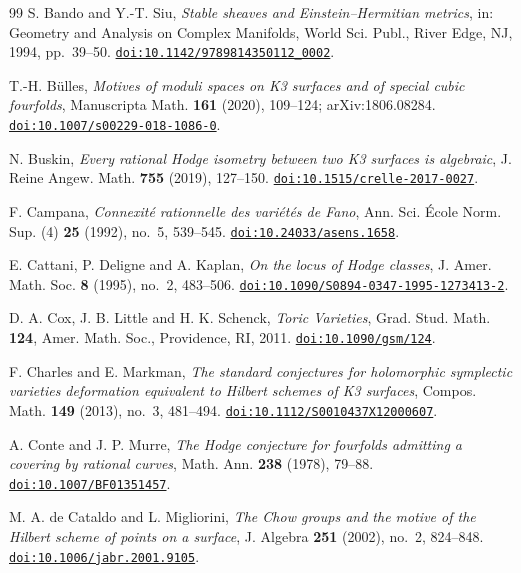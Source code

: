 \documentclass[11pt,reqno]{amsart}
\theoremstyle{plain}
\theoremstyle{definition}
\theoremstyle{remark}
\begin{document}
\begin{thebibliography}{99}
S. Bando and Y.-T. Siu,
\emph{Stable sheaves and Einstein--Hermitian metrics},
in: Geometry and Analysis on Complex Manifolds,
World Sci. Publ., River Edge, NJ, 1994, pp.~39--50.
\href{https://doi.org/10.1142/9789814350112_0002}{\texttt{doi:10.1142/9789814350112\_0002}}.

T.-H. B\"ulles,
\emph{Motives of moduli spaces on K3 surfaces and of special cubic
fourfolds},
Manuscripta Math. \textbf{161} (2020), 109--124; arXiv:1806.08284.
\href{https://doi.org/10.1007/s00229-018-1086-0}{\texttt{doi:10.1007/s00229-018-1086-0}}.

N. Buskin,
\emph{Every rational Hodge isometry between two K3 surfaces is algebraic},
J. Reine Angew. Math. \textbf{755} (2019), 127--150.
\href{https://doi.org/10.1515/crelle-2017-0027}{\texttt{doi:10.1515/crelle-2017-0027}}.

F. Campana,
\emph{Connexit\'e rationnelle des vari\'et\'es de Fano},
Ann. Sci. \'Ecole Norm. Sup. (4) \textbf{25} (1992), no.~5, 539--545.
\href{https://doi.org/10.24033/asens.1658}{\texttt{doi:10.24033/asens.1658}}.

E. Cattani, P. Deligne and A. Kaplan,
\emph{On the locus of Hodge classes},
J. Amer. Math. Soc. \textbf{8} (1995), no.~2, 483--506.
\href{https://doi.org/10.1090/S0894-0347-1995-1273413-2}{\texttt{doi:10.1090/S0894-0347-1995-1273413-2}}.

D. A. Cox, J. B. Little and H. K. Schenck,
\emph{Toric Varieties},
Grad. Stud. Math. \textbf{124}, Amer. Math. Soc., Providence, RI, 2011.
\href{https://doi.org/10.1090/gsm/124}{\texttt{doi:10.1090/gsm/124}}.

F. Charles and E. Markman,
\emph{The standard conjectures for holomorphic symplectic varieties
deformation equivalent to Hilbert schemes of K3 surfaces},
Compos. Math. \textbf{149} (2013), no.~3, 481--494.
\href{https://doi.org/10.1112/S0010437X12000607}{\texttt{doi:10.1112/S0010437X12000607}}.

A. Conte and J. P. Murre,
\emph{The Hodge conjecture for fourfolds admitting a covering by rational
curves},
Math. Ann. \textbf{238} (1978), 79--88.
\href{https://doi.org/10.1007/BF01351457}{\texttt{doi:10.1007/BF01351457}}.

M. A. de Cataldo and L. Migliorini,
\emph{The Chow groups and the motive of the Hilbert scheme of points on a
surface},
J. Algebra \textbf{251} (2002), no.~2, 824--848.
\href{https://doi.org/10.1006/jabr.2001.9105}{\texttt{doi:10.1006/jabr.2001.9105}}.


\end{thebibliography}
\end{document}

